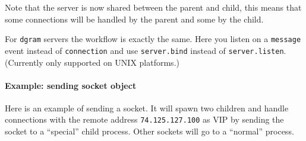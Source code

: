 \begin{Shaded}
\begin{Highlighting}[]
\NormalTok{(}\NormalTok{, }
   \NormalTok{) \{}
    \NormalTok{(}\NormalTok{, } 
      \NormalTok{(}\NormalTok{);}
    \NormalTok{\});}
  \NormalTok{\}}
\NormalTok{\});}
\end{Highlighting}
\end{Shaded}

Note that the server is now shared between the parent and child, this
means that some connections will be handled by the parent and some by
the child.

For \texttt{dgram} servers the workflow is exactly the same. Here you
listen on a \texttt{message} event instead of \texttt{connection} and
use \texttt{server.bind} instead of \texttt{server.listen}. (Currently
only supported on UNIX platforms.)

\paragraph{Example: sending socket
object}\label{example-sending-socket-object}

Here is an example of sending a socket. It will spawn two children and
handle connections with the remote address \texttt{74.125.127.100} as
VIP by sending the socket to a ``special'' child process. Other sockets
will go to a ``normal'' process.

